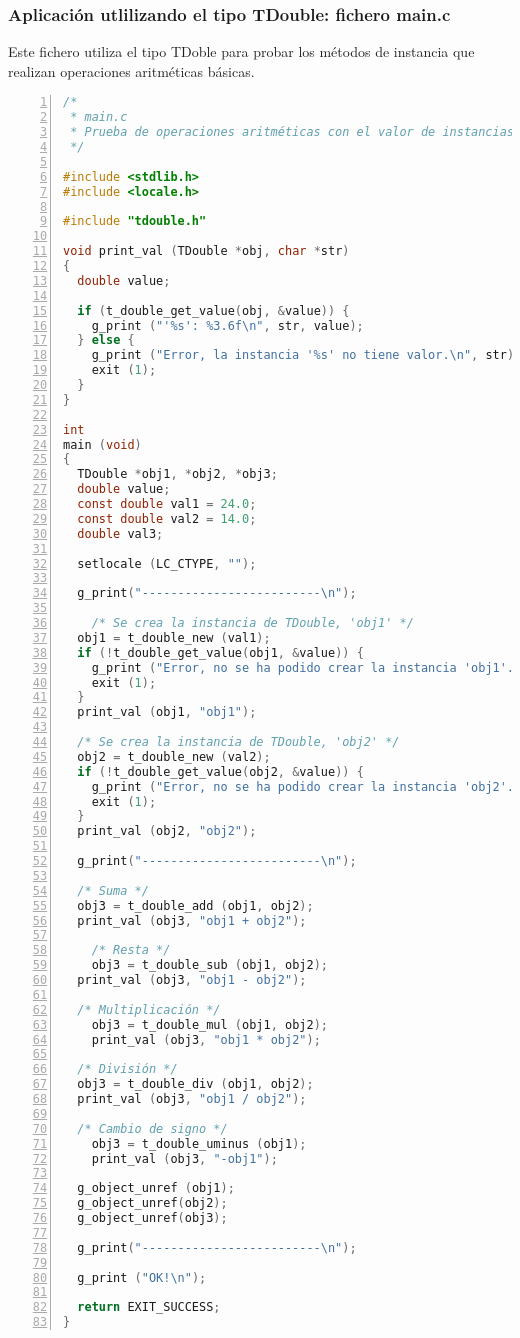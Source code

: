 \subsubsection{Aplicación utlilizando el tipo \textsf{TDouble}: fichero \textsf{main.c}}
Este fichero utiliza el tipo \textsf{TDoble} para probar los métodos de instancia que realizan operaciones
aritméticas básicas.

\begin{lstlisting}[language=C, numbers=left]
/*
 * main.c
 * Prueba de operaciones aritméticas con el valor de instancias TDouble.
 */

#include <stdlib.h>
#include <locale.h>

#include "tdouble.h"

void print_val (TDouble *obj, char *str)
{
  double value;
  
  if (t_double_get_value(obj, &value)) {
    g_print ("'%s': %3.6f\n", str, value);
  } else {
    g_print ("Error, la instancia '%s' no tiene valor.\n", str);
    exit (1);
  }
}

int
main (void)
{
  TDouble *obj1, *obj2, *obj3;
  double value;
  const double val1 = 24.0;
  const double val2 = 14.0;
  double val3;

  setlocale (LC_CTYPE, "");

  g_print("-------------------------\n");
  
    /* Se crea la instancia de TDouble, 'obj1' */
  obj1 = t_double_new (val1);
  if (!t_double_get_value(obj1, &value)) {
    g_print ("Error, no se ha podido crear la instancia 'obj1'.\n");
    exit (1);
  }
  print_val (obj1, "obj1");
  
  /* Se crea la instancia de TDouble, 'obj2' */
  obj2 = t_double_new (val2);
  if (!t_double_get_value(obj2, &value)) {
    g_print ("Error, no se ha podido crear la instancia 'obj2'.\n");
    exit (1);
  }
  print_val (obj2, "obj2");

  g_print("-------------------------\n");
    
  /* Suma */
  obj3 = t_double_add (obj1, obj2);
  print_val (obj3, "obj1 + obj2");

    /* Resta */
    obj3 = t_double_sub (obj1, obj2);
  print_val (obj3, "obj1 - obj2");

  /* Multiplicación */
    obj3 = t_double_mul (obj1, obj2);
    print_val (obj3, "obj1 * obj2");

  /* División */
  obj3 = t_double_div (obj1, obj2);
  print_val (obj3, "obj1 / obj2");

  /* Cambio de signo */
    obj3 = t_double_uminus (obj1);
    print_val (obj3, "-obj1");    

  g_object_unref (obj1);
  g_object_unref(obj2);
  g_object_unref(obj3);

  g_print("-------------------------\n");
    
  g_print ("OK!\n");

  return EXIT_SUCCESS;
}
\end{lstlisting}


